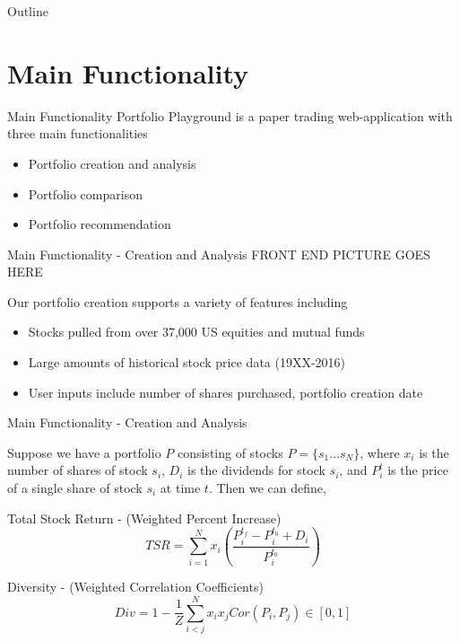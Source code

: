 \documentclass{beamer}
\begin{document}
\begin{frame}{Outline}
  \tableofcontents
\end{frame}

\section{Main Functionality}

\begin{frame}{Main Functionality}
Portfolio Playground is a paper trading web-application with three main functionalities \\

	\begin{itemize}
		\item Portfolio creation and analysis
		\item Portfolio comparison
		\item Portfolio recommendation
	\end{itemize}

\end{frame}

\begin{frame}{Main Functionality - Creation and Analysis}
FRONT END PICTURE GOES HERE

Our portfolio creation supports a variety of features including
	\begin{itemize}
		\item Stocks pulled from over 37,000 US equities and mutual funds
		\item Large amounts of historical stock price data (19XX-2016)
		\item User inputs include number of shares purchased, portfolio creation date
	\end{itemize}
\end{frame}

\begin{frame}{Main Functionality - Creation and Analysis}

Suppose we have a portfolio $P$ consisting of stocks $P = \{s_1\dots s_N\}$, where $x_i$ is the number of shares of stock $s_i$, $D_i$ is the dividends for stock $s_i$, and $P^{t}_{i}$ is the price of a single share of stock $s_i$ at time $t$. Then we can define,

\begin{block}{Total Stock Return - (Weighted Percent Increase)}
$$TSR = \sum_{i=1}^N x_i \left( \frac{P^{t_f}_{i} - P^{t_0}_{i} + D_i}{P^{t_0}_{i}} \right) $$
\end{block}

\begin{block}{Diversity - (Weighted Correlation Coefficients)}
$$Div = 1 - \frac{1}{Z} \sum_{i<j}^N x_i x_j Cor(P_i,P_j) \in \left[ 0,1 \right]$$ 
\end{block}

\end{frame}
\end{document}
